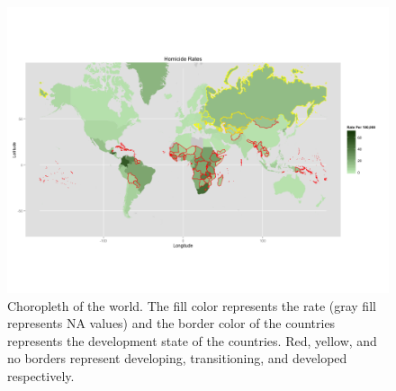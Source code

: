 \documentclass[12pt]{article}
\begin{document}
\begin{figure}[!ht]
    \centering
    \includegraphics[width=7in, keepaspectratio]{refuting_world_hom_ave.png}
    \caption{Choropleth of the world. The fill color represents the rate (gray fill represents NA values) and the border color of the countries represents the development state of the countries. Red, yellow, and no borders represent developing, transitioning, and developed respectively. }
    \label{fig:ref-choropleth}
\end{figure}
\end{document}
